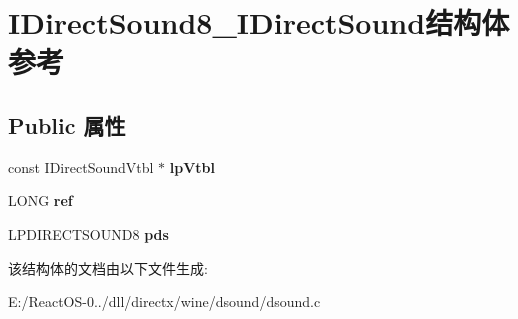 \hypertarget{struct_i_direct_sound8___i_direct_sound}{}\section{I\+Direct\+Sound8\+\_\+\+I\+Direct\+Sound结构体 参考}
\label{struct_i_direct_sound8___i_direct_sound}
\subsection*{Public 属性}
\begin{DoxyCompactItemize}
\item 
\mbox{\label{struct_i_direct_sound8___i_direct_sound_a8efac356db7f48f179d00051ffa0a5ec}} 
const I\+Direct\+Sound\+Vtbl $\ast$ {\bfseries lp\+Vtbl}
\item 
\mbox{\label{struct_i_direct_sound8___i_direct_sound_a2c8c6836929949ab51adf233612493e6}} 
L\+O\+NG {\bfseries ref}
\item 
\mbox{\label{struct_i_direct_sound8___i_direct_sound_a9aeea964ded02fea788b3c95adf41577}} 
L\+P\+D\+I\+R\+E\+C\+T\+S\+O\+U\+N\+D8 {\bfseries pds}
\end{DoxyCompactItemize}


该结构体的文档由以下文件生成\+:\begin{DoxyCompactItemize}
\item 
E\+:/\+React\+O\+S-\/0../dll/directx/wine/dsound/dsound.\+c\end{DoxyCompactItemize}
